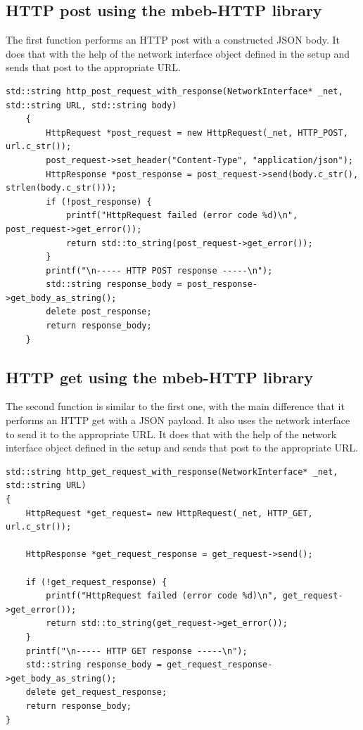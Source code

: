 \subsection{HTTP post using the mbeb-HTTP library}
The first function performs an HTTP post with a constructed JSON body.
It does that with the help of the network interface object defined in the setup and sends that post to the appropriate URL.
\begin{lstlisting}[style=CStyle]
    std::string http_post_request_with_response(NetworkInterface* _net, std::string URL, std::string body)
    {
        HttpRequest *post_request = new HttpRequest(_net, HTTP_POST, url.c_str());
        post_request->set_header("Content-Type", "application/json");
        HttpResponse *post_response = post_request->send(body.c_str(), strlen(body.c_str()));
        if (!post_response) {
            printf("HttpRequest failed (error code %d)\n", post_request->get_error());
            return std::to_string(post_request->get_error());
        }
        printf("\n----- HTTP POST response -----\n");
        std::string response_body = post_response->get_body_as_string();
        delete post_response;
        return response_body;
    }
\end{lstlisting}
\subsection{HTTP get using the mbeb-HTTP library}
The second function is similar to the first one, with the main difference that it performs an HTTP get with a JSON payload.
It also uses the network interface to send it to the appropriate URL.
It does that with the help of the network interface object defined in the setup and sends that post to the appropriate URL.
\begin{lstlisting}[style=CStyle]
std::string http_get_request_with_response(NetworkInterface* _net, std::string URL)
{
    HttpRequest *get_request= new HttpRequest(_net, HTTP_GET, url.c_str());

    HttpResponse *get_request_response = get_request->send();

    if (!get_request_response) {
        printf("HttpRequest failed (error code %d)\n", get_request->get_error());
        return std::to_string(get_request->get_error());
    }
    printf("\n----- HTTP GET response -----\n");
    std::string response_body = get_request_response->get_body_as_string();
    delete get_request_response;
    return response_body;
}
\end{lstlisting}
